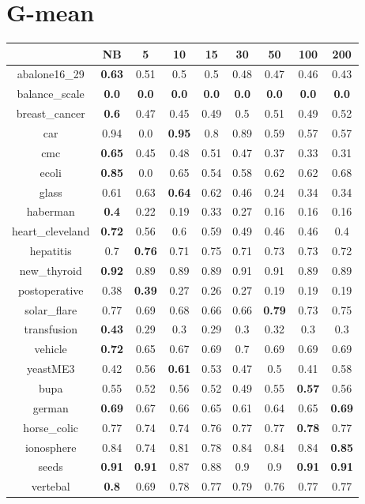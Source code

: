 \documentclass{article}%
\begin{document}
%
\section*{G{-}mean}%
\begin{tabular}{c|cccccccc}%
\hline%
&NB&5&10&15&30&50&100&200\\%
\hline%
abalone16\_29&\textbf{0.63}&0.51&0.5&0.5&0.48&0.47&0.46&0.43\\%
\hline%
balance\_scale&\textbf{0.0}&\textbf{0.0}&\textbf{0.0}&\textbf{0.0}&\textbf{0.0}&\textbf{0.0}&\textbf{0.0}&\textbf{0.0}\\%
\hline%
breast\_cancer&\textbf{0.6}&0.47&0.45&0.49&0.5&0.51&0.49&0.52\\%
\hline%
car&0.94&0.0&\textbf{0.95}&0.8&0.89&0.59&0.57&0.57\\%
\hline%
cmc&\textbf{0.65}&0.45&0.48&0.51&0.47&0.37&0.33&0.31\\%
\hline%
ecoli&\textbf{0.85}&0.0&0.65&0.54&0.58&0.62&0.62&0.68\\%
\hline%
glass&0.61&0.63&\textbf{0.64}&0.62&0.46&0.24&0.34&0.34\\%
\hline%
haberman&\textbf{0.4}&0.22&0.19&0.33&0.27&0.16&0.16&0.16\\%
\hline%
heart\_cleveland&\textbf{0.72}&0.56&0.6&0.59&0.49&0.46&0.46&0.4\\%
\hline%
hepatitis&0.7&\textbf{0.76}&0.71&0.75&0.71&0.73&0.73&0.72\\%
\hline%
new\_thyroid&\textbf{0.92}&0.89&0.89&0.89&0.91&0.91&0.89&0.89\\%
\hline%
postoperative&0.38&\textbf{0.39}&0.27&0.26&0.27&0.19&0.19&0.19\\%
\hline%
solar\_flare&0.77&0.69&0.68&0.66&0.66&\textbf{0.79}&0.73&0.75\\%
\hline%
transfusion&\textbf{0.43}&0.29&0.3&0.29&0.3&0.32&0.3&0.3\\%
\hline%
vehicle&\textbf{0.72}&0.65&0.67&0.69&0.7&0.69&0.69&0.69\\%
\hline%
yeastME3&0.42&0.56&\textbf{0.61}&0.53&0.47&0.5&0.41&0.58\\%
\hline%
bupa&0.55&0.52&0.56&0.52&0.49&0.55&\textbf{0.57}&0.56\\%
\hline%
german&\textbf{0.69}&0.67&0.66&0.65&0.61&0.64&0.65&\textbf{0.69}\\%
\hline%
horse\_colic&0.77&0.74&0.74&0.76&0.77&0.77&\textbf{0.78}&0.77\\%
\hline%
ionosphere&0.84&0.74&0.81&0.78&0.84&0.84&0.84&\textbf{0.85}\\%
\hline%
seeds&\textbf{0.91}&\textbf{0.91}&0.87&0.88&0.9&0.9&\textbf{0.91}&\textbf{0.91}\\%
\hline%
vertebal&\textbf{0.8}&0.69&0.78&0.77&0.79&0.76&0.77&0.77\\%
\hline%
\end{tabular}

%
\end{document}

